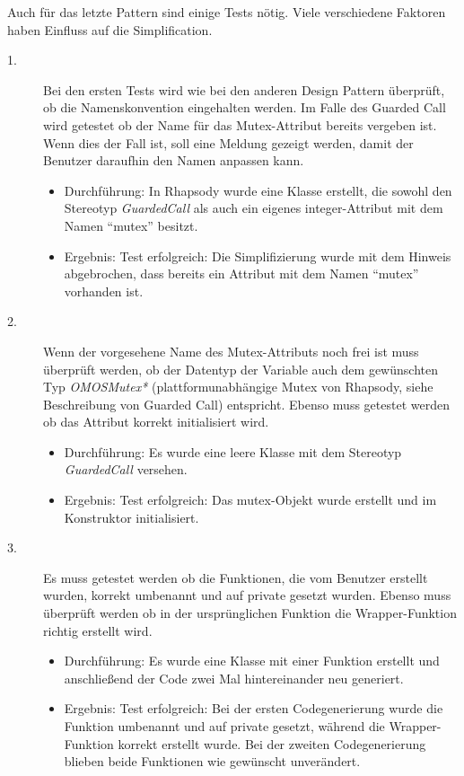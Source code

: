 Auch für das letzte Pattern sind einige Tests nötig. Viele verschiedene Faktoren
haben Einfluss auf die Simplification.
\begin{description}

	\item[1.]
	Bei den ersten Tests wird wie bei den anderen Design Pattern überprüft, ob die Namenskonvention eingehalten werden. Im Falle des Guarded Call wird getestet ob der Name für das Mutex-Attribut bereits vergeben ist. Wenn dies der Fall ist, soll eine Meldung gezeigt werden, damit der Benutzer daraufhin den Namen anpassen kann.
	\begin{itemize}
  		\item{Durchführung:}
			In Rhapsody wurde eine Klasse erstellt, die sowohl den Stereotyp \textit{GuardedCall} als auch ein eigenes integer-Attribut mit dem Namen \enquote{mutex} besitzt.
  		\item{Ergebnis:}
			Test erfolgreich: Die Simplifizierung wurde mit dem Hinweis abgebrochen, dass bereits ein Attribut mit dem Namen \enquote{mutex} vorhanden ist.
  	\end{itemize}
	
	\item[2.]
	Wenn der vorgesehene Name des Mutex-Attributs noch frei ist muss überprüft werden, ob der Datentyp der Variable auch dem gewünschten Typ \textit{OMOSMutex*} (plattformunabhängige Mutex von Rhapsody, siehe Beschreibung von Guarded Call) entspricht. Ebenso muss getestet werden ob das Attribut korrekt initialisiert wird.
	\begin{itemize}
  		\item{Durchführung:}
			Es wurde eine leere Klasse mit dem Stereotyp \textit{GuardedCall} versehen.
  		\item{Ergebnis:}
			Test erfolgreich: Das mutex-Objekt wurde erstellt und im Konstruktor initialisiert.
  	\end{itemize}
	
	\item[3.]
	Es muss getestet werden ob die Funktionen, die vom Benutzer erstellt wurden, korrekt umbenannt und auf private gesetzt wurden. Ebenso muss überprüft werden ob in der ursprünglichen Funktion die Wrapper-Funktion richtig erstellt wird.
	\begin{itemize}
  		\item{Durchführung:}
			Es wurde eine Klasse mit einer Funktion erstellt und anschließend der Code zwei Mal hintereinander neu generiert.
  		\item{Ergebnis:}
			Test erfolgreich: Bei der ersten Codegenerierung wurde die Funktion umbenannt und auf private gesetzt, während die Wrapper-Funktion korrekt erstellt wurde. Bei der zweiten Codegenerierung blieben beide Funktionen wie gewünscht unverändert.
  	\end{itemize}
	

\end{description}
